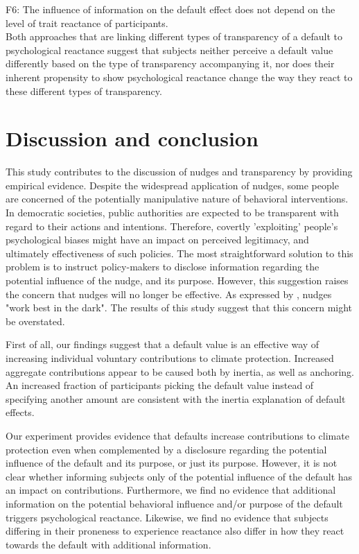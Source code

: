 \documentclass[review, authoryear,12pt]{elsarticle}
\begin{document}
F6: The influence of information on the default effect does not depend on the level of trait reactance of participants. \\

Both approaches that are linking different types of transparency of a default to psychological reactance suggest that subjects neither perceive a default value differently based on the type of transparency accompanying it, nor does their inherent propensity to show psychological reactance change the way they react to these different types of transparency.

\section{Discussion and conclusion}
This study contributes to the discussion of nudges and transparency by providing empirical evidence. Despite the widespread application of nudges, some people are concerned of the potentially manipulative nature of behavioral interventions. In democratic societies, public authorities are expected to be transparent with regard to their actions and intentions. Therefore, covertly 'exploiting' people's psychological biases might have an impact on perceived legitimacy, and ultimately effectiveness of such policies. The most straightforward solution to this problem is to instruct policy-makers to disclose information regarding the potential influence of the nudge, and its purpose. However, this suggestion raises the concern that nudges will no longer be effective. As expressed by \cite{Bovens.2009}, nudges "work best in the dark". The results of this study suggest that this concern might be overstated. 

First of all, our findings suggest that a default value is an effective way of increasing individual voluntary contributions to climate protection. Increased aggregate contributions appear to be caused both by inertia, as well as anchoring. An increased fraction of participants picking the default value instead of specifying another amount are consistent with the inertia explanation of default effects.

Our experiment provides evidence that defaults increase contributions to climate protection even when complemented by a disclosure regarding the potential influence of the default and its purpose, or just its purpose. However, it is not clear whether informing subjects only of the potential influence of the default has an impact on contributions. Furthermore, we find no evidence that additional information on the potential behavioral influence and/or purpose of the default triggers psychological reactance. Likewise, we find no evidence that subjects differing in their proneness to experience reactance also differ in how they react towards the default with additional information.
\end{document}
